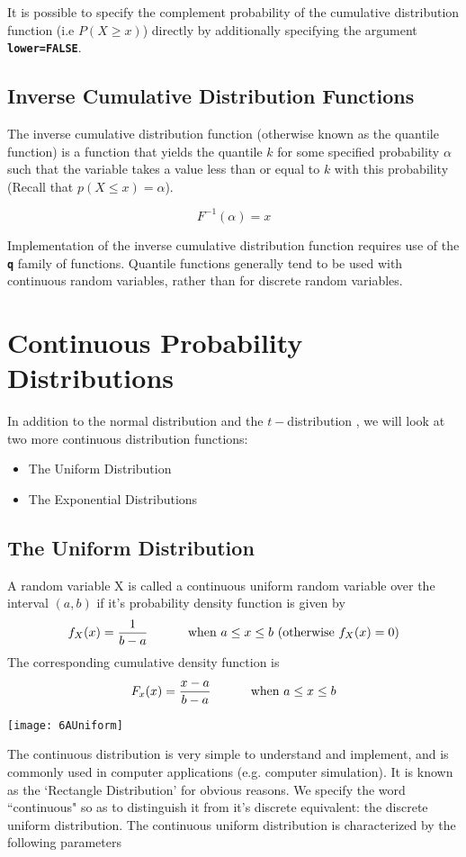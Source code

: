 It is possible to specify the complement probability of the cumulative distribution function (i.e $P(X \geq x)$) directly by additionally specifying the argument \texttt{\textbf{lower=FALSE}}.
 
\subsection{Inverse Cumulative Distribution Functions}

The inverse cumulative distribution function (otherwise known as the quantile function) is a function that yields the quantile $k$ for some specified probability $\alpha$ such that the variable takes a value less than or equal to $k$ with this probability (Recall that $p(X \leq x) = \alpha $).

\[F^{-1}(\alpha) = x  \]

Implementation of the inverse cumulative distribution function requires use of the \texttt{\textbf{q}} family of functions. Quantile functions generally tend to be used with continuous random variables, rather than for discrete random variables.


\section{Continuous Probability Distributions}
In addition to the normal distribution and the $t-$distribution , we will look at two more continuous distribution functions: 
\begin{itemize}
\item The Uniform Distribution
\item The Exponential Distributions
\end{itemize}
\subsection{The Uniform Distribution}

A random variable X is called a continuous uniform random variable over the interval $(a,b)$ if it's probability density function is given by
\[ f_{X}(x) = { 1 \over b-a} \hspace{1cm} \mbox{ when } a \leq x \leq b \mbox{     (otherwise } f_X(x) = 0 ) \]
The corresponding cumulative density function is
\[ F_x(x) = { x-a \over b-a} \hspace{1cm} \mbox{ when } a \leq x \leq b\]


\begin{center}
\texttt{[image: 6AUniform]}
\end{center}
The continuous distribution is very simple to understand and implement, and is commonly used in computer applications (e.g. computer simulation).
It is known as the `Rectangle Distribution' for obvious reasons. We specify the word ``continuous" so as to distinguish it from it's discrete equivalent: the discrete uniform distribution.
The continuous uniform distribution is characterized by the following parameters

